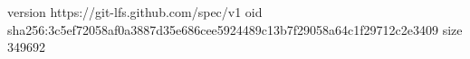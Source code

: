 version https://git-lfs.github.com/spec/v1
oid sha256:3c5ef72058af0a3887d35e686cee5924489c13b7f29058a64c1f29712c2e3409
size 349692
